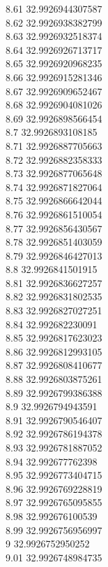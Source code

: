 {8.61	32.9926944307587\\
8.62	32.9926938382799\\
8.63	32.9926932518374\\
8.64	32.9926926713717\\
8.65	32.9926920968235\\
8.66	32.9926915281346\\
8.67	32.9926909652467\\
8.68	32.9926904081026\\
8.69	32.9926898566454\\
8.7	32.9926893108185\\
8.71	32.9926887705663\\
8.72	32.9926882358333\\
8.73	32.9926877065648\\
8.74	32.9926871827064\\
8.75	32.9926866642044\\
8.76	32.9926861510054\\
8.77	32.9926856430567\\
8.78	32.9926851403059\\
8.79	32.9926846427013\\
8.8	32.9926841501915\\
8.81	32.9926836627257\\
8.82	32.9926831802535\\
8.83	32.9926827027251\\
8.84	32.992682230091\\
8.85	32.9926817623023\\
8.86	32.9926812993105\\
8.87	32.9926808410677\\
8.88	32.9926803875261\\
8.89	32.9926799386388\\
8.9	32.9926794943591\\
8.91	32.9926790546407\\
8.92	32.9926786194378\\
8.93	32.9926781887052\\
8.94	32.992677762398\\
8.95	32.9926773404715\\
8.96	32.9926769228819\\
8.97	32.9926765095855\\
8.98	32.992676100539\\
8.99	32.9926756956997\\
9	32.9926752950252\\
9.01	32.9926748984735\\
}
